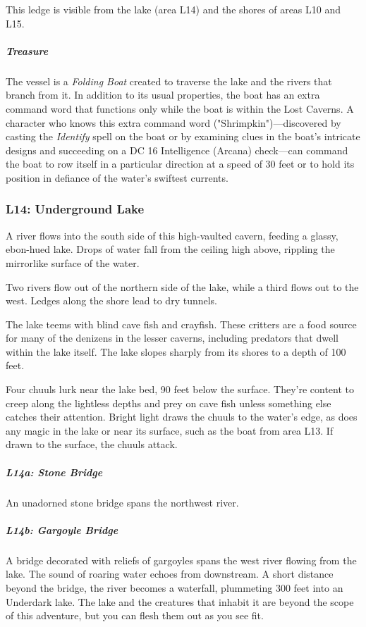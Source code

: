 \documentclass[10pt,a4paper,twoside,bg=print,twocolumn,openany,nodeprecatedcode]{dndbook}
\begin{document}
This ledge is visible from the lake (area L14) and the shores of areas L10 and L15.

\subparagraph{Treasure}
The vessel is a \textit{Folding Boat} created to traverse the lake and the rivers that branch from it. In addition to its usual properties, the boat has an extra command word that functions only while the boat is within the Lost Caverns. A character who knows this extra command word ("Shrimpkin")—discovered by casting the \textit{Identify} spell on the boat or by examining clues in the boat's intricate designs and succeeding on a DC 16 Intelligence (Arcana) check—can command the boat to row itself in a particular direction at a speed of 30 feet or to hold its position in defiance of the water's swiftest currents.

\subsubsection{L14: Underground Lake}
\begin{DndReadAloud}{}
A river flows into the south side of this high-vaulted cavern, feeding a glassy, ebon-hued lake. Drops of water fall from the ceiling high above, rippling the mirrorlike surface of the water.

Two rivers flow out of the northern side of the lake, while a third flows out to the west. Ledges along the shore lead to dry tunnels.

\end{DndReadAloud}

The lake teems with blind cave fish and crayfish. These critters are a food source for many of the denizens in the lesser caverns, including predators that dwell within the lake itself. The lake slopes sharply from its shores to a depth of 100 feet.

Four chuuls lurk near the lake bed, 90 feet below the surface. They're content to creep along the lightless depths and prey on cave fish unless something else catches their attention. Bright light draws the chuuls to the water's edge, as does any magic in the lake or near its surface, such as the boat from area L13. If drawn to the surface, the chuuls attack.

\subparagraph{L14a: Stone Bridge}
An unadorned stone bridge spans the northwest river.

\subparagraph{L14b: Gargoyle Bridge}
A bridge decorated with reliefs of gargoyles spans the west river flowing from the lake. The sound of roaring water echoes from downstream. A short distance beyond the bridge, the river becomes a waterfall, plummeting 300 feet into an Underdark lake. The lake and the creatures that inhabit it are beyond the scope of this adventure, but you can flesh them out as you see fit.
\end{document}
